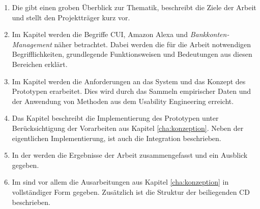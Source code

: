 \begin{enumerate}
  \item Die  gibt einen groben Überblick zur Thematik, beschreibt die Ziele der Arbeit und stellt den Projektträger kurz vor.
  
  \item Im Kapitel  werden die Begriffe \ac{CUI}, Amazon Alexa und \textit{Bankkonten-Management} näher betrachtet. Dabei werden die für die Arbeit notwendigen Begrifflichkeiten, grundlegende Funktionsweisen und Bedeutungen aus diesen Bereichen erklärt.
  
  \item Im Kapitel  werden die Anforderungen an das System und das Konzept des Prototypen erarbeitet. Dies wird \ua durch das Sammeln empirischer Daten und der Anwendung von Methoden aus dem Usability Engineering erreicht. 
  
  \item Das Kapitel  beschreibt die Implementierung des Prototypen unter Berücksichtigung der Vorarbeiten aus Kapitel \ref{cha:konzeption}. Neben der eigentlichen Implementierung, ist auch die Integration beschrieben.
  
  \item In der  werden die Ergebnisse der Arbeit zusammengefasst und ein Ausblick gegeben.
  
  \item Im  sind vor allem die Ausarbeitungen aus Kapitel \ref{cha:konzeption} in vollständiger Form gegeben. Zusätzlich ist die Struktur der beiliegenden CD beschrieben.
\end{enumerate}

